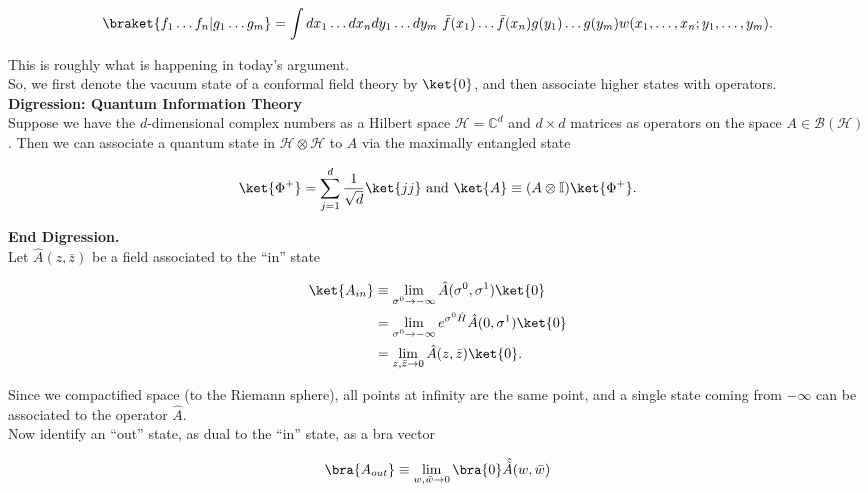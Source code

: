 \begin{equation}
\braket{ f_1 \dots f_n | g_1 \dots g_m } = \int dx_1 \dots dx_n dy_1 \dots dy_m \,\, \bar{f} (x_1) \dots \bar{f} (x_n) g(y_1) \dots g(y_m) w(x_1, \dots, x_n ; y_1, \dots, y_m).
\end{equation}

\noindent This is roughly what is happening in today's argument. \\

\noindent So, we first denote the vacuum state of a conformal field theory by $\ket{0}$, and then associate higher states with operators. \\

\noindent \textbf{Digression: Quantum Information Theory} \\

\noindent Suppose we have the $d$-dimensional complex numbers as a Hilbert space $\mathcal{H} = \mathbb{C}^d$ and $d \times d$ matrices as operators on the space $A \in \mathcal{B} (\mathcal{H})$. Then we can associate a quantum state in $\mathcal{H} \otimes \mathcal{H}$ to $A$ via the maximally entangled state

\begin{equation}
\ket{\Phi^+} = \sum_{j=1}^d \frac{1}{\sqrt{d}} \ket{jj} \text{ and } \ket{A} \equiv (A \otimes \mathbb{I}) \ket{\Phi^+}.
\end{equation}

\noindent \textbf{End Digression.} \\

\noindent Let $\hat{A} (z, \bar{z})$ be a field associated to the ``in'' state

\begin{align}
\ket{A_{in}} &\equiv \lim_{\sigma^0 \rightarrow -\infty} \hat{A} (\sigma^0, \sigma^1) \ket{0} \\
&= \lim_{\sigma^0 \rightarrow -\infty} e^{\sigma^0 \hat{H}} \hat{A} (0, \sigma^1) \ket{0} \\
&= \lim_{z, \bar{z} \rightarrow 0} \hat{A} (z, \bar{z}) \ket{0}.
\end{align}

\noindent Since we compactified space (to the Riemann sphere), all points at infinity are the same point, and a single state coming from $-\infty$ can be associated to the operator $\hat{A}$. \\

\noindent Now identify an ``out'' state, as dual to the ``in'' state, as a bra vector

\begin{equation}
\bra{A_{out}} \equiv \lim_{w,\bar{w} \rightarrow 0} \bra{0} \hat{\tilde{A}} (w,\bar{w})
\end{equation}

